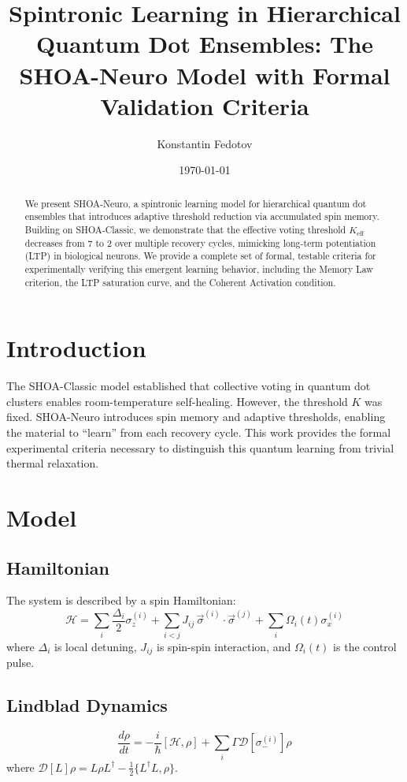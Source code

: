 \documentclass[12pt]{article}
\title{Spintronic Learning in Hierarchical Quantum Dot Ensembles: The SHOA-Neuro Model with Formal Validation Criteria}
\author{Konstantin Fedotov}
\date{\today}
\begin{document}
\maketitle

\begin{abstract}
We present SHOA-Neuro, a spintronic learning model for hierarchical quantum dot ensembles that introduces adaptive threshold reduction via accumulated spin memory. Building on SHOA-Classic, we demonstrate that the effective voting threshold $K_{\text{eff}}$ decreases from 7 to 2 over multiple recovery cycles, mimicking long-term potentiation (LTP) in biological neurons. We provide a complete set of formal, testable criteria for experimentally verifying this emergent learning behavior, including the Memory Law criterion, the LTP saturation curve, and the Coherent Activation condition.
\end{abstract}

\section{Introduction}
The SHOA-Classic model established that collective voting in quantum dot clusters enables room-temperature self-healing. However, the threshold $K$ was fixed. SHOA-Neuro introduces spin memory and adaptive thresholds, enabling the material to ``learn'' from each recovery cycle. This work provides the formal experimental criteria necessary to distinguish this quantum learning from trivial thermal relaxation.

\section{Model}
\subsection{Hamiltonian}
The system is described by a spin Hamiltonian:
\begin{equation}
\mathcal{H} = \sum_i \frac{\Delta_i}{2} \sigma_z^{(i)} + \sum_{i<j} J_{ij} \, \vec{\sigma}^{(i)} \cdot \vec{\sigma}^{(j)} + \sum_i \Omega_i(t) \sigma_x^{(i)}
\end{equation}
where $\Delta_i$ is local detuning, $J_{ij}$ is spin-spin interaction, and $\Omega_i(t)$ is the control pulse.

\subsection{Lindblad Dynamics}
\begin{equation}
\frac{d\rho}{dt} = -\frac{i}{\hbar} [\mathcal{H}, \rho] + \sum_i \Gamma \mathcal{D}[\sigma_-^{(i)}]\rho
\end{equation}
where $\mathcal{D}[L]\rho = L \rho L^\dagger - \frac{1}{2} \{ L^\dagger L, \rho \}$.
\end{document}
